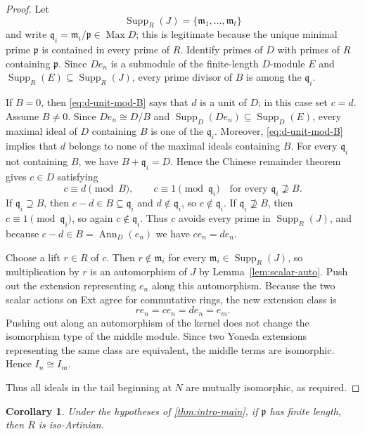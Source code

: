 \documentclass[11pt]{article}
\newtheorem{corollary}[theorem]{Corollary}
\theoremstyle{definition}
\newcommand{\Max}{\operatorname{Max}}
\newcommand{\Supp}{\operatorname{Supp}}
\newcommand{\Ann}{\operatorname{Ann}}
\begin{document}
\begin{proof}
Let
\[
 \Supp_R(J)=\{\mathfrak m_1,\ldots,\mathfrak m_t\}
\]
and write $\mathfrak q_i=\mathfrak m_i/\mathfrak p\in\Max D$; this is legitimate
because the unique minimal prime $\mathfrak p$ is contained in every prime of $R$.
Identify primes of $D$ with primes of $R$ containing $\mathfrak p$.  Since
$De_n$ is a submodule of the finite-length $D$-module $E$ and
$\Supp_R(E)\subseteq\Supp_R(J)$, every prime divisor of $B$ is among the
$\mathfrak q_i$.

If $B=0$, then \eqref{eq:d-unit-mod-B} says that $d$ is a unit of $D$; in this case set
$c=d$.  Assume $B\ne0$.  Since $De_n\cong D/B$ and
$\Supp_D(De_n)\subseteq\Supp_D(E)$, every maximal ideal of $D$
containing $B$ is one of the $\mathfrak q_i$.  Moreover,
\eqref{eq:d-unit-mod-B} implies that $d$ belongs to none of the maximal ideals containing $B$.
For every $\mathfrak q_i$ not containing $B$, we have $B+\mathfrak q_i=D$.  Hence the Chinese
remainder theorem gives $c\in D$ satisfying
\begin{equation}\label{eq:c-choice}
 c\equiv d\pmod B,
 \qquad
 c\equiv1\pmod{\mathfrak q_i}
 \quad\text{for every }\mathfrak q_i\not\supseteq B.
\end{equation}
If $\mathfrak q_i\supseteq B$, then $c-d\in B\subseteq\mathfrak q_i$ and
$d\notin\mathfrak q_i$, so $c\notin\mathfrak q_i$.  If $\mathfrak q_i\not\supseteq B$,
then $c\equiv1\pmod{\mathfrak q_i}$, so again $c\notin\mathfrak q_i$.  Thus $c$ avoids every
prime in $\Supp_R(J)$, and because $c-d\in B=\Ann_D(e_n)$ we have $ce_n=de_n$.

Choose a lift $r\in R$ of $c$.  Then $r\notin\mathfrak m_i$ for every
$\mathfrak m_i\in\Supp_R(J)$, so multiplication by $r$ is an automorphism of $J$ by
Lemma~\ref{lem:scalar-auto}.  Push out the extension representing $e_n$ along this automorphism.
Because the two scalar actions on Ext agree for commutative rings, the new extension class is
\[
 re_n=ce_n=de_n=e_m.
\]
Pushing out along an automorphism of the kernel does not change the isomorphism type of the
middle module.  Since two Yoneda extensions representing the same class are equivalent, the
middle terms are isomorphic.  Hence $I_n\cong I_m$.

Thus all ideals in the tail beginning at $N$ are mutually isomorphic, as required.
\end{proof}

\begin{corollary}\label{cor:sufficiency}
Under the hypotheses of \cref{thm:intro-main}, if $\mathfrak p$ has finite length, then $R$ is
iso-Artinian.
\end{corollary}
\end{document}
